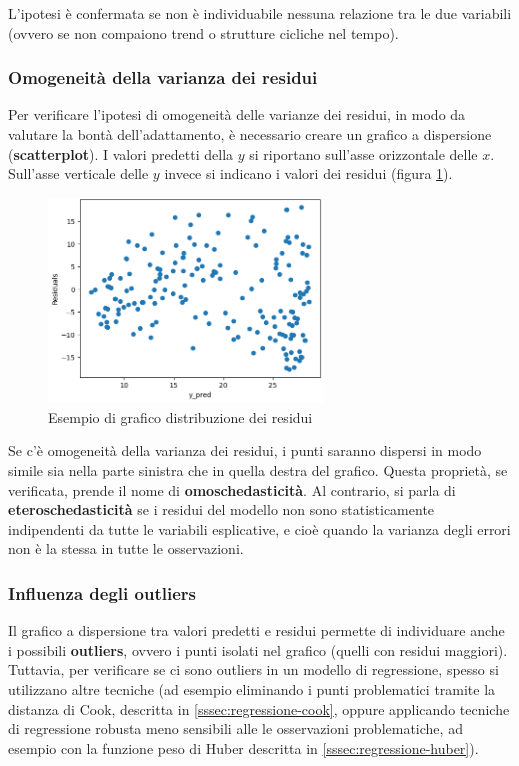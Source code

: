 L’ipotesi è confermata se non è individuabile nessuna relazione tra le due variabili (ovvero se non compaiono trend o strutture cicliche nel tempo).

\subsubsection{Omogeneità della varianza dei residui}\label{ssec:omogeneita-varianza}
Per verificare l’ipotesi di omogeneità delle varianze dei residui, in modo da valutare la bontà dell'adattamento, è necessario creare un grafico a dispersione (\textbf{scatterplot}). I valori predetti della $y$ si riportano sull’asse orizzontale delle $x$. Sull’asse verticale delle $y$ invece si indicano i valori dei residui (figura \ref{fig:distr_residui}). \cite{residui_pozzolo}

\begin{figure}[H]
\centering
\includegraphics[width=0.65\textwidth,height=\textheight,keepaspectratio]{img/distr_residui.png}
\caption{Esempio di grafico distribuzione dei residui}
\label{fig:distr_residui}
\end{figure}

Se c’è omogeneità della varianza dei residui, i punti saranno dispersi in modo simile sia nella parte sinistra che in quella destra del grafico. Questa proprietà, se verificata, prende il nome di \textbf{omoschedasticità}. Al contrario, si parla di \textbf{eteroschedasticità} se i residui del modello non sono statisticamente indipendenti da tutte le variabili esplicative, e cioè quando la varianza degli errori non è la stessa in tutte le osservazioni.

\subsubsection{Influenza degli outliers}\label{ssec:influenza-outliers}
Il grafico a dispersione tra valori predetti e residui permette di individuare anche i possibili \textbf{outliers}, ovvero i punti isolati nel grafico (quelli con residui maggiori).
Tuttavia, per verificare se ci sono outliers in un modello di regressione, spesso si utilizzano altre tecniche (ad esempio eliminando i punti problematici tramite la distanza di Cook, descritta in \ref{sssec:regressione-cook}, oppure applicando tecniche di regressione robusta meno sensibili alle le osservazioni problematiche, ad esempio con la funzione peso di Huber  descritta in \ref{sssec:regressione-huber}).

